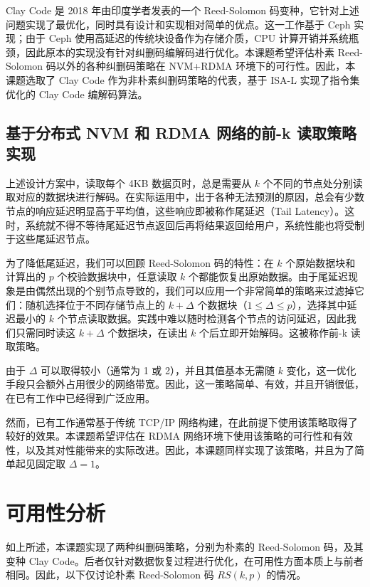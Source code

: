 Clay Code\cite{claycode2018} 是 2018 年由印度学者发表的一个 Reed-Solomon 码变种，它针对上述问题实现了最优化，同时具有设计和实现相对简单的优点。这一工作基于 Ceph 实现；由于 Ceph 使用高延迟的传统块设备作为存储介质，CPU 计算开销并系统瓶颈，因此原本的实现没有针对纠删码编解码进行优化。本课题希望评估朴素 Reed-Solomon 码以外的各种纠删码策略在 NVM+RDMA 环境下的可行性。因此，本课题选取了 Clay Code 作为非朴素纠删码策略的代表，基于 ISA-L 实现了指令集优化的 Clay Code 编解码算法。

\subsection{基于分布式 NVM 和 RDMA 网络的前-k 读取策略实现}
\label{subsec:ch3_first_k}

上述设计方案中，读取每个 4KB 数据页时，总是需要从 $k$ 个不同的节点处分别读取对应的数据块进行解码。在实际运用中，出于各种无法预测的原因，总会有少数节点的响应延迟明显高于平均值，这些响应即被称作尾延迟（Tail Latency）。这时，系统就不得不等待尾延迟节点返回后再将结果返回给用户，系统性能也将受制于这些尾延迟节点。

为了降低尾延迟，我们可以回顾 Reed-Solomon 码的特性：在 $k$ 个原始数据块和计算出的 $p$ 个校验数据块中，任意读取 $k$ 个都能恢复出原始数据。由于尾延迟现象是由偶然出现的个别节点导致的，我们可以应用一个非常简单的策略来过滤掉它们：随机选择位于不同存储节点上的 $k + \Delta$ 个数据块（$1 \leq \Delta \leq p$），选择其中延迟最小的 $k$ 个节点读取数据。实践中难以随时检测各个节点的访问延迟，因此我们只需同时读这 $k + \Delta$ 个数据块，在读出 $k$ 个后立即开始解码。这被称作前-k 读取策略。

由于 $\Delta$ 可以取得较小（通常为 1 或 2），并且其值基本无需随 $k$ 变化，这一优化手段只会额外占用很少的网络带宽。因此，这一策略简单、有效，并且开销很低，在已有工作中已经得到广泛应用\cite{distcache2019,infinicache2020,hydra2019}。

然而，已有工作通常基于传统 TCP/IP 网络构建，在此前提下使用该策略取得了较好的效果。本课题希望评估在 RDMA 网络环境下使用该策略的可行性和有效性，以及其对性能带来的实际改进。因此，本课题同样实现了该策略，并且为了简单起见固定取 $\Delta = 1$。

\section{可用性分析}
\label{sec:ch3_avail}

如上所述，本课题实现了两种纠删码策略，分别为朴素的 Reed-Solomon 码，及其变种 Clay Code。后者仅针对数据恢复过程进行优化，在可用性方面本质上与前者相同。因此，以下仅讨论朴素 Reed-Solomon 码 $RS(k, p)$ 的情况。

